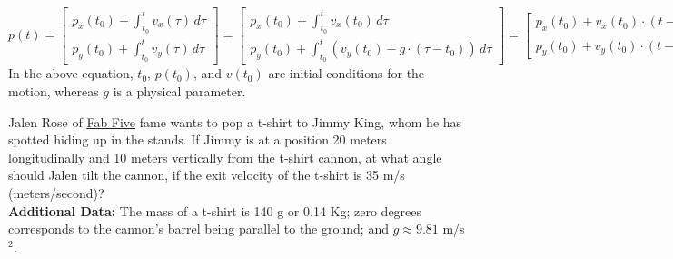 \begin{equation}
\label{eqn:IntegrateVelocity4Position02}
    p(t) = 
     \left[\begin{array}{l} p_x(t_0) + \int_{t_0}^t  v_x(\tau)\,  d\tau\\[1em]  
    p_y(t_0) + \int_{t_0}^t v_y(\tau) \, d\tau \end{array} \right] = 
     \left[\begin{array}{l} p_x(t_0) + \int_{t_0}^t  v_x(t_0)\,  d\tau\\[1em]  
    p_y(t_0) + \int_{t_0}^t \left(v_y(t_0) - g \cdot (\tau - t_0)  \right) \, d\tau \end{array} \right] = 
      \left[\begin{array}{l} p_x(t_0) +  v_x(t_0)  \cdot (t - t_0) \\[1em]  
  p_y(t_0) +   v_y(t_0)  \cdot (t - t_0) -  \frac{1}{2} \, g  \cdot (t -t_0)^2\end{array} \right].
\end{equation}
In the above equation, $t_0$, $p(t_0)$, and $v(t_0)$ are initial conditions for the motion, whereas $g$ is a physical parameter. 

\bigskip

\begin{figure}[hbt]%
\centering
{}%
\hspace{5pt}%
\centering
{}%
        \label{fig:JalenRose}
\end{figure}

\begin{example} Jalen Rose of \href{https://en.wikipedia.org/wiki/Fab_Five_(University_of_Michigan)}{Fab Five} fame wants to pop a t-shirt to Jimmy King, whom he has spotted hiding up in the stands. If Jimmy is at a position 20 meters longitudinally and 10 meters vertically from the t-shirt cannon, at what angle should Jalen tilt the cannon, if the exit velocity of the t-shirt is 35 m/s (meters/second)? \\

\textbf{Additional Data:} The mass of a t-shirt is 140 g or 0.14 Kg; zero degrees corresponds to the cannon's barrel being parallel to the ground; and $g\approx 9.81$ m/s$^2$.    
\end{example}

